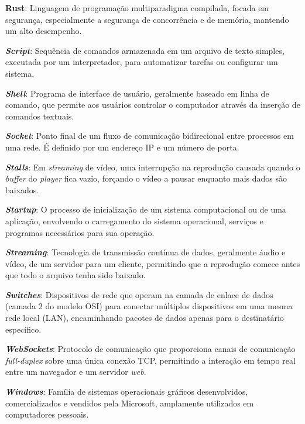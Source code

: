 {\textbf{Rust}: Linguagem de programação multiparadigma compilada, focada em segurança, especialmente a segurança de concorrência e de memória, mantendo um alto desempenho.

\textbf{\textit{Script}}: Sequência de comandos armazenada em um arquivo de texto simples, executada por um interpretador, para automatizar tarefas ou configurar um sistema.

\textbf{\textit{Shell}}: Programa de interface de usuário, geralmente baseado em linha de comando, que permite aos usuários controlar o computador através da inserção de comandos textuais.

\textbf{\textit{Socket}}: Ponto final de um fluxo de comunicação bidirecional entre processos em uma rede. É definido por um endereço IP e um número de porta.

\textbf{\textit{Stalls}}: Em \textit{streaming} de vídeo, uma interrupção na reprodução causada quando o \textit{buffer} do \textit{player} fica vazio, forçando o vídeo a pausar enquanto mais dados são baixados.

\textbf{\textit{Startup}}: O processo de inicialização de um sistema computacional ou de uma aplicação, envolvendo o carregamento do sistema operacional, serviços e programas necessários para sua operação.

\textbf{\textit{Streaming}}: Tecnologia de transmissão contínua de dados, geralmente áudio e vídeo, de um servidor para um cliente, permitindo que a reprodução comece antes que todo o arquivo tenha sido baixado.

\textbf{\textit{Switches}}: Dispositivos de rede que operam na camada de enlace de dados (camada 2 do modelo OSI) para conectar múltiplos dispositivos em uma mesma rede local (LAN), encaminhando pacotes de dados apenas para o destinatário específico.

\textbf{\textit{Web\textit{Socket}s}}: Protocolo de comunicação que proporciona canais de comunicação\textit{ full-duplex} sobre uma única conexão TCP, permitindo a interação em tempo real entre um navegador e um servidor \textit{web}.

\textbf{\textit{Windows}}: Família de sistemas operacionais gráficos desenvolvidos, comercializados e vendidos pela Microsoft, amplamente utilizados em computadores pessoais.
}


